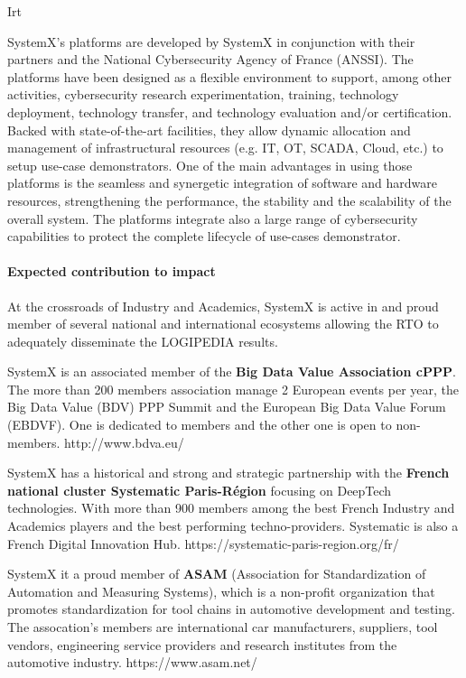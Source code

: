 \begin{sitedescription}{Irt}


SystemX’s platforms are developed by SystemX in conjunction with their partners and the National Cybersecurity Agency of France (ANSSI). The platforms have been designed as a flexible environment to support, among other activities, cybersecurity research experimentation, training, technology deployment, technology transfer, and technology evaluation and/or certification.  Backed with state-of-the-art facilities, they allow dynamic allocation and management of infrastructural resources (e.g. IT, OT, SCADA, Cloud, etc.) to setup use-case demonstrators. One of the main advantages in using those platforms is the seamless and synergetic integration of software and hardware resources, strengthening the performance, the stability and the scalability of the overall system. The platforms integrate also a large range of cybersecurity capabilities to protect the complete lifecycle of use-cases demonstrator.





\paragraph*{Expected contribution to impact}
At the crossroads of Industry and Academics, SystemX is active in and proud member of several national and international ecosystems allowing the RTO to adequately disseminate the LOGIPEDIA results.

SystemX is an associated member of the {\bf Big Data Value Association cPPP}. The more than 200 members association manage 2 European events per year, the Big Data Value (BDV) PPP Summit and the European Big Data Value Forum (EBDVF). One is dedicated to members and the other one is open to non-members. http://www.bdva.eu/

SystemX has a historical and strong and strategic partnership with the {\bf French national cluster Systematic Paris-Région} focusing on DeepTech technologies. With more than 900 members among the best French Industry and Academics players and the best performing techno-providers. Systematic is also a French Digital Innovation Hub. https://systematic-paris-region.org/fr/

SystemX it a proud member of {\bf ASAM} (Association for Standardization of Automation and Measuring Systems), which is a non-profit organization that promotes standardization for tool chains in automotive development and testing. The assocation’s members are international car manufacturers, suppliers, tool vendors, engineering service providers and research institutes from the automotive industry. https://www.asam.net/


\end{sitedescription}
